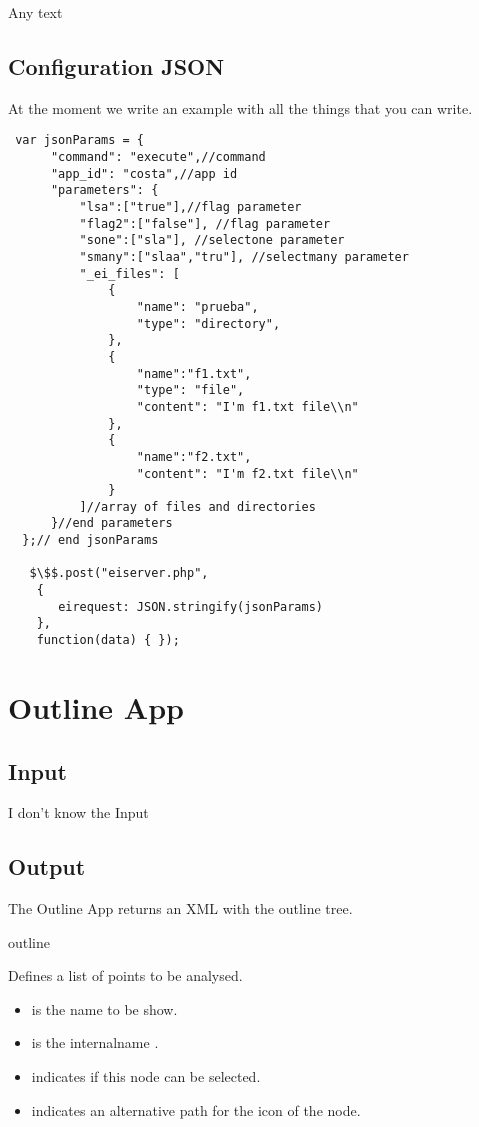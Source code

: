\noindent
{}

Any text

\bigskip
\bigskip
\section{Configuration JSON}

At the moment we write an example with
 all the things that you can write.

\begin{lstlisting}
 var jsonParams = {
      "command": "execute",//command
      "app_id": "costa",//app id
      "parameters": {
          "lsa":["true"],//flag parameter
          "flag2":["false"], //flag parameter
          "sone":["sla"], //selectone parameter
          "smany":["slaa","tru"], //selectmany parameter
          "_ei_files": [
              {
                  "name": "prueba",
                  "type": "directory",
              },
              {
                  "name":"f1.txt",
                  "type": "file",
                  "content": "I'm f1.txt file\\n"
              },
              {
                  "name":"f2.txt",
                  "content": "I'm f2.txt file\\n"
              }
          ]//array of files and directories
      }//end parameters
  };// end jsonParams

   $\$$.post("eiserver.php",
    {
       eirequest: JSON.stringify(jsonParams)
    },
    function(data) { });
\end{lstlisting}

\chapter{Outline App}

\section{Input}
I don't know the Input

\section{Output}
The Outline App returns an XML with the outline tree.

\bigskip
\xmlstruct
{outline}
{
%
  Defines a list of points to be analysed.
\begin{itemize}
  \item {} is the name to be show.
   \item {} is the internalname .
\item {} indicates if this node can be
  selected.
\item {} indicates an alternative path for the icon
  of the node.

\end{itemize}
%
}
{}


